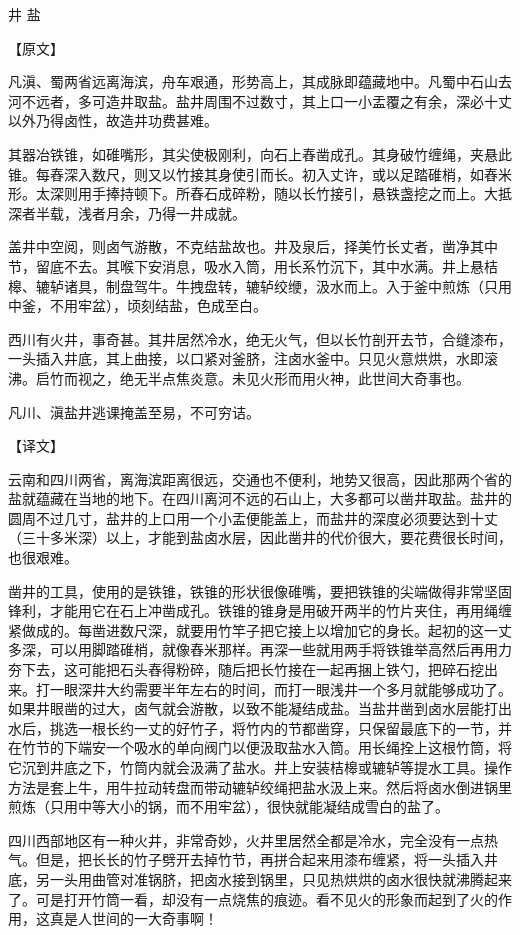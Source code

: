 \documentclass[12pt,UTF8]{ctexbook}
\begin{document}
井 盐

【原文】

凡滇、蜀两省远离海滨，舟车艰通，形势高上，其成脉即蕴藏地中。凡蜀中石山去河不远者，多可造井取盐。盐井周围不过数寸，其上口一小盂覆之有余，深必十丈以外乃得卤性，故造井功费甚难。

其器冶铁锥，如碓嘴形，其尖使极刚利，向石上舂凿成孔。其身破竹缠绳，夹悬此锥。每舂深入数尺，则又以竹接其身使引而长。初入丈许，或以足踏碓梢，如舂米形。太深则用手捧持顿下。所舂石成碎粉，随以长竹接引，悬铁盏挖之而上。大抵深者半载，浅者月余，乃得一井成就。

盖井中空阅，则卤气游散，不克结盐故也。井及泉后，择美竹长丈者，凿净其中节，留底不去。其喉下安消息，吸水入筒，用长系竹沉下，其中水满。井上悬桔槔、辘轳诸具，制盘驾牛。牛拽盘转，辘轳绞缏，汲水而上。入于釜中煎炼（只用中釜，不用牢盆），顷刻结盐，色成至白。

西川有火井，事奇甚。其井居然冷水，绝无火气，但以长竹剖开去节，合缝漆布，一头插入井底，其上曲接，以口紧对釜脐，注卤水釜中。只见火意烘烘，水即滚沸。启竹而视之，绝无半点焦炎意。未见火形而用火神，此世间大奇事也。

凡川、滇盐井逃课掩盖至易，不可穷诘。

【译文】

云南和四川两省，离海滨距离很远，交通也不便利，地势又很高，因此那两个省的盐就蕴藏在当地的地下。在四川离河不远的石山上，大多都可以凿井取盐。盐井的圆周不过几寸，盐井的上口用一个小盂便能盖上，而盐井的深度必须要达到十丈（三十多米深）以上，才能到盐卤水层，因此凿井的代价很大，要花费很长时间，也很艰难。

凿井的工具，使用的是铁锥，铁锥的形状很像碓嘴，要把铁锥的尖端做得非常坚固锋利，才能用它在石上冲凿成孔。铁锥的锥身是用破开两半的竹片夹住，再用绳缠紧做成的。每凿进数尺深，就要用竹竿子把它接上以增加它的身长。起初的这一丈多深，可以用脚踏碓梢，就像舂米那样。再深一些就用两手将铁锥举高然后再用力夯下去，这可能把石头舂得粉碎，随后把长竹接在一起再捆上铁勺，把碎石挖出来。打一眼深井大约需要半年左右的时间，而打一眼浅井一个多月就能够成功了。如果井眼凿的过大，卤气就会游散，以致不能凝结成盐。当盐井凿到卤水层能打出水后，挑选一根长约一丈的好竹子，将竹内的节都凿穿，只保留最底下的一节，并在竹节的下端安一个吸水的单向阀门以便汲取盐水入筒。用长绳拴上这根竹筒，将它沉到井底之下，竹筒内就会汲满了盐水。井上安装桔槔或辘轳等提水工具。操作方法是套上牛，用牛拉动转盘而带动辘轳绞绳把盐水汲上来。然后将卤水倒进锅里煎炼（只用中等大小的锅，而不用牢盆），很快就能凝结成雪白的盐了。

四川西部地区有一种火井，非常奇妙，火井里居然全都是冷水，完全没有一点热气。但是，把长长的竹子劈开去掉竹节，再拼合起来用漆布缠紧，将一头插入井底，另一头用曲管对准锅脐，把卤水接到锅里，只见热烘烘的卤水很快就沸腾起来了。可是打开竹筒一看，却没有一点烧焦的痕迹。看不见火的形象而起到了火的作用，这真是人世间的一大奇事啊！
\end{document}
